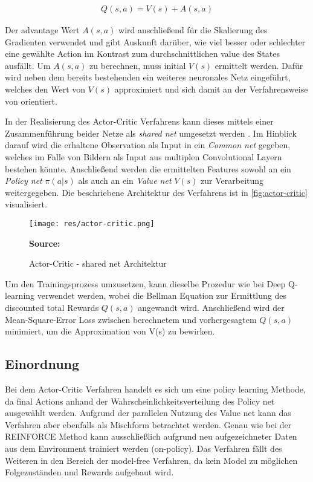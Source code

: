 \documentclass[11pt]{scrartcl}
\newcommand{\source}[1]{\vspace{-5pt} \caption*{\hfill \textbf{Source:} {#1}} }
\begin{document}
\begin{align}
Q(s,a)=V(s)+A(s,a)
\label{aln:actor-critic-advantage}
\end{align}

Der advantage Wert $A(s,a)$ wird anschließend für die Skalierung des Gradienten verwendet und gibt Auskunft
darüber, wie viel besser oder schlechter eine gewählte Action im Kontrast zum durchschnittlichen value des
States ausfällt. Um $A(s,a)$ zu berechnen, muss initial $V(s)$ ermittelt werden. Dafür wird neben dem bereits
bestehenden ein weiteres neuronales Netz eingeführt, welches den Wert von $V(s)$ approximiert und sich damit
an der Verfahrensweise von  orientiert.

In der Realisierung des Actor-Critic Verfahrens kann dieses mittels einer Zusammenführung beider Netze als
\textit{shared net} umgesetzt werden  \cite[~S.269]{L2018}. Im Hinblick darauf wird die erhaltene
Observation als Input in ein \textit{Common net} gegeben, welches im Falle von Bildern als Input aus
multiplen Convolutional Layern bestehen könnte. Anschließend werden die ermittelten Features sowohl an
ein \textit{Policy net} $\pi(a|s)$ als auch an ein \textit{Value net} $V(s)$ zur Verarbeitung
weitergegeben. Die beschriebene Architektur des Verfahrens ist in \autoref{fig:actor-critic}
visualisiert.

\begin{figure}[htp]
\centering
\texttt{[image: res/actor-critic.png]}
\caption{Actor-Critic - shared net Architektur}
\source{\cite[~S.268 - Chapter 10 - Figure 5]{L2018}}
\label{fig:actor-critic}
\end{figure}

Um den Trainingsprozess umzusetzen, kann dieselbe Prozedur wie bei Deep Q-learning verwendet werden, wobei
die Bellman Equation zur Ermittlung des discounted total Rewards $Q(s,a)$ angewandt wird. Anschließend wird
der Mean-Square-Error Loss zwischen berechnetem und vorhergesagtem $Q(s,a)$ minimiert, um die Approximation
von V(s) zu bewirken.


\subsection{Einordnung}
Bei dem Actor-Critic Verfahren handelt es sich um eine policy learning Methode, da final Actions anhand der
Wahrscheinlichkeitsverteilung des Policy net ausgewählt werden. Aufgrund der parallelen Nutzung des Value
net kann das Verfahren aber ebenfalls als Mischform betrachtet werden. Genau wie bei der REINFORCE Method
kann ausschließlich aufgrund neu aufgezeichneter Daten aus dem Environment trainiert werden (on-policy).
Das Verfahren fällt des Weiteren in den Bereich der model-free Verfahren, da kein Model zu möglichen
Folgezuständen und Rewards aufgebaut wird. 
\end{document}
